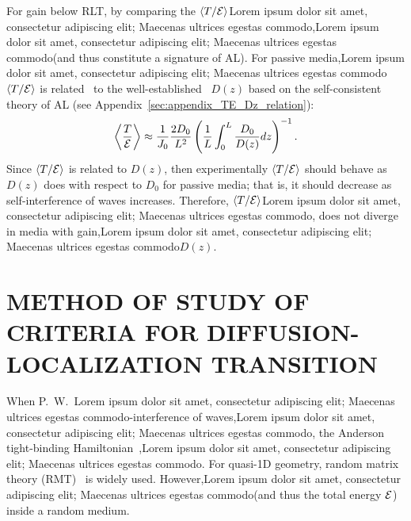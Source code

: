 For gain below RLT, by comparing the $\langle T / {\cal E} \rangle $Lorem ipsum dolor sit amet, consectetur adipiscing elit; Maecenas ultrices egestas commodo,Lorem ipsum dolor sit amet, consectetur adipiscing elit; Maecenas ultrices egestas commodo(and thus constitute a signature of AL). For passive media,Lorem ipsum dolor sit amet, consectetur adipiscing elit; Maecenas ultrices egestas commodo$\langle T / {\cal E} \rangle $ is related~\cite{2010_Payne_TE} to the well-established~\cite{2008_Cherroret} $D(z)$ based on the self-consistent theory of AL (see Appendix~\ref{sec:appendix_TE_Dz_relation}):
\begin{equation}
\left\langle \frac{ T }{{\cal E}}\right\rangle \approx \frac{1}{J_0} \frac{2 D_0}{L^2} \left(\frac{1}{L} \int_0^L \frac{D_0}{D(z)} dz \right)^{-1}.
\label{eq:TE_related_Dz}
\end{equation}
Since $\langle T /{\cal E}\rangle$ is related to $D(z)$, then experimentally $\langle T /{\cal E}\rangle$ should behave as $D(z)$ does with respect to $D_0$ for passive media; that is, it should decrease as self-interference of waves increases. Therefore, $\langle T /{\cal E}\rangle$Lorem ipsum dolor sit amet, consectetur adipiscing elit; Maecenas ultrices egestas commodo, does not diverge in media with gain,Lorem ipsum dolor sit amet, consectetur adipiscing elit; Maecenas ultrices egestas commodo$D(z)$.


\section{METHOD OF STUDY OF CRITERIA FOR DIFFUSION- LOCALIZATION TRANSITION}
\label{sec:method_numerical}

When P.~W.~Lorem ipsum dolor sit amet, consectetur adipiscing elit; Maecenas ultrices egestas commodo-interference of waves,Lorem ipsum dolor sit amet, consectetur adipiscing elit; Maecenas ultrices egestas commodo, the Anderson tight-binding Hamiltonian~\cite{1958_Anderson},Lorem ipsum dolor sit amet, consectetur adipiscing elit; Maecenas ultrices egestas commodo. For quasi-1D geometry, random matrix theory (RMT)~\cite{1951_Wigner,1997_Beenakker,2009_Beenakker} %
is widely used. However,Lorem ipsum dolor sit amet, consectetur adipiscing elit; Maecenas ultrices egestas commodo(and thus the total energy ${\cal E}$) inside a random medium.

